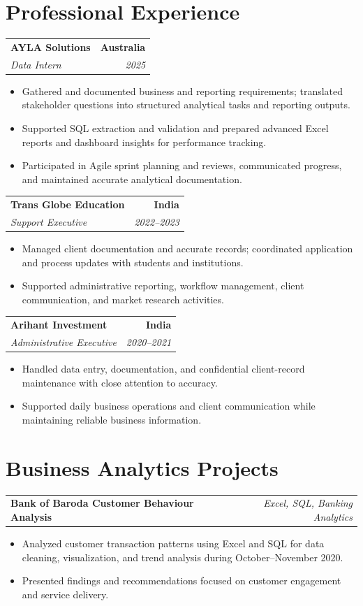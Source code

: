 \documentclass[letterpaper,10pt]{article}
\makeatletter
\newcommand{\role}[4]{%
  \begin{tabularx}{\textwidth}{@{}Xr@{}}
    \textbf{#1} & \textbf{#2} \\
    \textit{#3} & \textit{#4}
  \end{tabularx}\vspace{-1pt}
}
\newcommand{\project}[2]{%
  \begin{tabularx}{\textwidth}{@{}Xr@{}}
    \textbf{#1} & \textit{#2}
  \end{tabularx}\vspace{-1pt}
}
\makeatother
\begin{document}
\section{Professional Experience}
\role{AYLA Solutions}{Australia}{Data Intern}{2025}
\begin{itemize}
  \item Gathered and documented business and reporting requirements; translated stakeholder questions into structured analytical tasks and reporting outputs.
  \item Supported SQL extraction and validation and prepared advanced Excel reports and dashboard insights for performance tracking.
  \item Participated in Agile sprint planning and reviews, communicated progress, and maintained accurate analytical documentation.
\end{itemize}
\vspace{1pt}

\role{Trans Globe Education}{India}{Support Executive}{2022--2023}
\begin{itemize}
  \item Managed client documentation and accurate records; coordinated application and process updates with students and institutions.
  \item Supported administrative reporting, workflow management, client communication, and market research activities.
\end{itemize}
\vspace{1pt}

\role{Arihant Investment}{India}{Administrative Executive}{2020--2021}
\begin{itemize}
  \item Handled data entry, documentation, and confidential client-record maintenance with close attention to accuracy.
  \item Supported daily business operations and client communication while maintaining reliable business information.
\end{itemize}

\section{Business Analytics Projects}
\project{Bank of Baroda Customer Behaviour Analysis}{Excel, SQL, Banking Analytics}
\begin{itemize}
  \item Analyzed customer transaction patterns using Excel and SQL for data cleaning, visualization, and trend analysis during October--November 2020.
  \item Presented findings and recommendations focused on customer engagement and service delivery.
\end{itemize}
\vspace{1pt}
\end{document}
